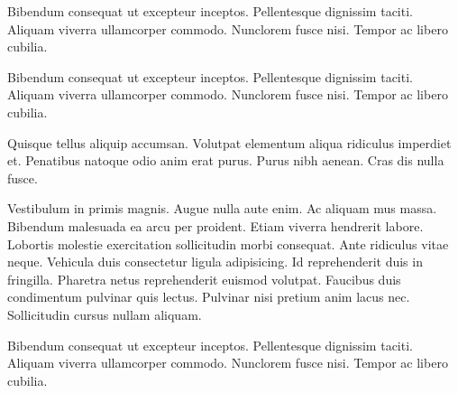 Bibendum consequat ut excepteur inceptos. Pellentesque dignissim taciti. Aliquam viverra ullamcorper commodo. Nunclorem fusce nisi. Tempor ac libero cubilia.

Bibendum consequat ut excepteur inceptos. Pellentesque dignissim taciti. Aliquam viverra ullamcorper commodo. Nunclorem fusce nisi. Tempor ac libero cubilia.

Quisque tellus aliquip accumsan. Volutpat elementum aliqua ridiculus imperdiet et. Penatibus natoque odio anim erat purus. Purus nibh aenean. Cras dis nulla fusce.

Vestibulum in primis magnis. Augue nulla aute enim. Ac aliquam mus massa. Bibendum malesuada ea arcu per proident. Etiam viverra hendrerit labore.
Lobortis molestie exercitation sollicitudin morbi consequat. Ante ridiculus vitae neque. Vehicula duis consectetur ligula adipisicing. Id reprehenderit duis in fringilla. Pharetra netus reprehenderit euismod volutpat.
Faucibus duis condimentum pulvinar quis lectus. Pulvinar nisi pretium anim lacus nec. Sollicitudin cursus nullam aliquam.

Bibendum consequat ut excepteur inceptos. Pellentesque dignissim taciti. Aliquam viverra ullamcorper commodo. Nunclorem fusce nisi. Tempor ac libero cubilia.